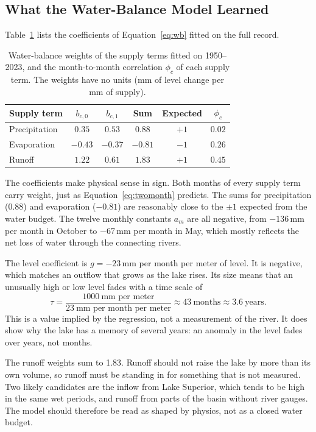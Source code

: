 \documentclass{article}
\begin{document}
\subsection{What the Water-Balance Model Learned}

Table~\ref{tab:coef} lists the coefficients of Equation~\ref{eq:wb} fitted on the full record.

\begin{table}[htbp]
\centering
\caption{Water-balance weights of the supply terms fitted on 1950--2023, and the
month-to-month correlation $\phi_c$ of each supply term. The weights have no units (mm of level
change per mm of supply).}
\label{tab:coef}
\begin{tabular}{||l|c|c|c|c|c||}
\hline\hline
Supply term & $b_{c,0}$ & $b_{c,1}$ & Sum & Expected & $\phi_c$ \\
\hline\hline
Precipitation & $0.35$ & $0.53$ & $0.88$ & $+1$ & $0.02$ \\
Evaporation & $-0.43$ & $-0.37$ & $-0.81$ & $-1$ & $0.26$ \\
Runoff & $1.22$ & $0.61$ & $1.83$ & $+1$ & $0.45$ \\
\hline\hline
\end{tabular}
\end{table}

The coefficients make physical sense in sign. Both months of every supply term carry weight, just
as Equation~\ref{eq:twomonth} predicts. The sums for precipitation (0.88) and evaporation
($-0.81$) are reasonably close to the $\pm 1$ expected from the water budget. The twelve monthly
constants $a_m$ are all negative, from $-136$\,mm per month in October to $-67$\,mm per month in
May, which mostly reflects the net loss of water through the connecting rivers.

The level coefficient is $g = -23$\,mm per month per meter of level. It is negative, which
matches an outflow that grows as the lake rises. Its size means that an unusually high or low
level fades with a time scale of
\begin{equation}
\tau = \frac{1000\ \text{mm per meter}}{23\ \text{mm per month per meter}} \approx 43\
\text{months} \approx 3.6\ \text{years}. \label{eq:tau}
\end{equation}
This is a value implied by the regression, not a measurement of the river. It does show why the
lake has a memory of several years: an anomaly in the level fades over years, not months.

The runoff weights sum to 1.83. Runoff should not raise the lake by more than its own volume, so
runoff must be standing in for something that is not measured. Two likely candidates are the
inflow from Lake Superior, which tends to be high in the same wet periods, and runoff from parts
of the basin without river gauges. The model should therefore be read as shaped by physics, not
as a closed water budget.
\end{document}
